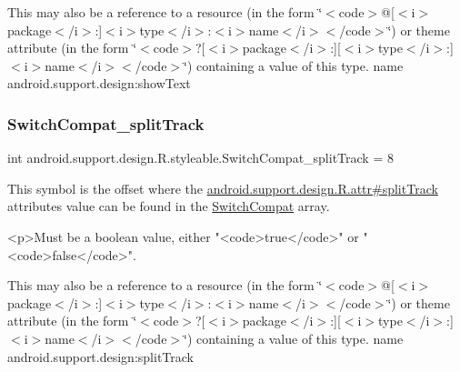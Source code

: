 This may also be a reference to a resource (in the form \char`\"{}$<$code$>$@\mbox{[}$<$i$>$package$<$/i$>$\+:\mbox{]}$<$i$>$type$<$/i$>$\+:$<$i$>$name$<$/i$>$$<$/code$>$\char`\"{}) or theme attribute (in the form \char`\"{}$<$code$>$?\mbox{[}$<$i$>$package$<$/i$>$\+:\mbox{]}\mbox{[}$<$i$>$type$<$/i$>$\+:\mbox{]}$<$i$>$name$<$/i$>$$<$/code$>$\char`\"{}) containing a value of this type.  name android.\+support.\+design\+:show\+Text \mbox{\label{classandroid_1_1support_1_1design_1_1R_1_1styleable_a68f00076b8d71029b001f03098c38865}} 
\subsubsection{\texorpdfstring{Switch\+Compat\+\_\+split\+Track}{SwitchCompat\_splitTrack}}
{\footnotesize\ttfamily int android.\+support.\+design.\+R.\+styleable.\+Switch\+Compat\+\_\+split\+Track = 8\hspace{0.3cm}{\ttfamily [static]}}

This symbol is the offset where the \hyperlink{classandroid_1_1support_1_1design_1_1R_1_1attr_af1afe003beae279b9c25c54488687c06}{android.\+support.\+design.\+R.\+attr\#split\+Track} attribute\textquotesingle{}s value can be found in the \hyperlink{classandroid_1_1support_1_1design_1_1R_1_1styleable_a7389a923bf3e321b6b5d10b0589547a1}{Switch\+Compat} array.

\begin{DoxyVerb}      <p>Must be a boolean value, either "<code>true</code>" or "<code>false</code>".
\end{DoxyVerb}
 

This may also be a reference to a resource (in the form \char`\"{}$<$code$>$@\mbox{[}$<$i$>$package$<$/i$>$\+:\mbox{]}$<$i$>$type$<$/i$>$\+:$<$i$>$name$<$/i$>$$<$/code$>$\char`\"{}) or theme attribute (in the form \char`\"{}$<$code$>$?\mbox{[}$<$i$>$package$<$/i$>$\+:\mbox{]}\mbox{[}$<$i$>$type$<$/i$>$\+:\mbox{]}$<$i$>$name$<$/i$>$$<$/code$>$\char`\"{}) containing a value of this type.  name android.\+support.\+design\+:split\+Track \mbox{\label{classandroid_1_1support_1_1design_1_1R_1_1styleable_a585749966845c547e820061f2d0f6148}} 
